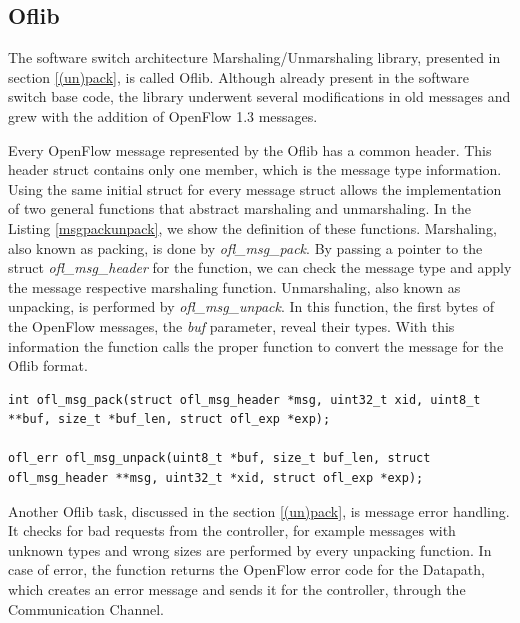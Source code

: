 \subsection{Oflib}
\label{sec:sec41}

The software switch architecture Marshaling/Unmarshaling library, presented in section \ref{(un)pack}, is called Oflib. Although already present in the software switch base code, the library underwent several modifications in old messages and grew with the addition of OpenFlow 1.3 messages.

Every OpenFlow message represented by the Oflib has a common header. This header struct contains only one member, which is the message type information. Using the same initial struct for every message struct allows the implementation of two general functions that abstract marshaling and unmarshaling. In the Listing \ref{msgpackunpack}, we show the definition of these functions. Marshaling, also known as packing, is done by \textit{ofl_msg_pack}. By passing a pointer to the struct \textit{ofl_msg_header} for the function, we can check the message type and apply the message respective marshaling function. Unmarshaling, also known as unpacking, is performed by \textit{ofl_msg_unpack}. In this function, the first bytes of the OpenFlow messages, the \textit{buf} parameter, reveal their types. With this information the function calls the proper function to convert the message for the Oflib format.  
\begin{lstlisting}[caption={Oflib: message pack and unpack base functions}, label=msgpackunpack,]
int ofl_msg_pack(struct ofl_msg_header *msg, uint32_t xid, uint8_t **buf, size_t *buf_len, struct ofl_exp *exp);

ofl_err ofl_msg_unpack(uint8_t *buf, size_t buf_len, struct ofl_msg_header **msg, uint32_t *xid, struct ofl_exp *exp);
\end{lstlisting}

Another Oflib task, discussed in the section \ref{(un)pack}, is message error handling. It checks for bad requests from the controller, for example messages with unknown types and wrong sizes are performed by every unpacking function. In case of error, the function returns the OpenFlow error code for the Datapath, which creates an error message and sends it for the controller, through the Communication Channel.


